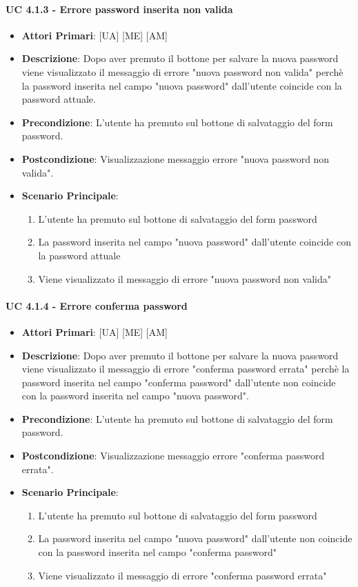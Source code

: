 			\paragraph{UC 4.1.3 - Errore password inserita non valida}
			\begin{itemize}
				\item \textbf{Attori Primari}: [UA] [ME] [AM]
				\item \textbf{Descrizione}: Dopo aver premuto il bottone per salvare la nuova password viene visualizzato il messaggio di errore "nuova password non valida" perchè la password inserita nel campo "nuova password" dall'utente coincide con la password attuale.
				\item \textbf{Precondizione}: L'utente ha premuto sul bottone di salvataggio del form password.
				\item \textbf{Postcondizione}: Visualizzazione messaggio errore "nuova password non valida".
				\item \textbf{Scenario Principale}:
				\begin{enumerate}
					\item{L'utente ha premuto sul bottone di salvataggio del form password}
					\item{La password inserita nel campo "nuova password" dall'utente coincide con la password attuale}
					\item{Viene visualizzato il messaggio di errore "nuova password non valida"}
				\end{enumerate}
			\end{itemize}

			\paragraph{UC 4.1.4 - Errore conferma password}
			\begin{itemize}
				\item \textbf{Attori Primari}: [UA] [ME] [AM]
				\item \textbf{Descrizione}: Dopo aver premuto il bottone per salvare la nuova password viene visualizzato il messaggio di errore "conferma password errata" perchè la password inserita nel campo "conferma password" dall'utente non coincide con la password inserita nel campo "nuova password".
				\item \textbf{Precondizione}: L'utente ha premuto sul bottone di salvataggio del form password.
				\item \textbf{Postcondizione}: Visualizzazione messaggio errore "conferma password errata".
				\item \textbf{Scenario Principale}:
				\begin{enumerate}
					\item{L'utente ha premuto sul bottone di salvataggio del form password}
					\item{La password inserita nel campo "nuova password" dall'utente non coincide con la password inserita nel campo "conferma password"}
					\item{Viene visualizzato il messaggio di errore "conferma password errata"}
				\end{enumerate}
			\end{itemize}
			
